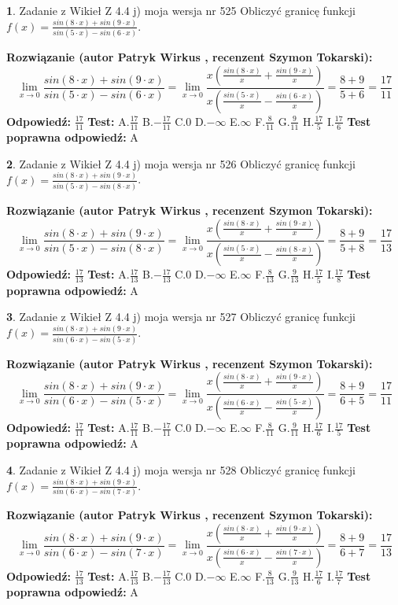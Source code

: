 \documentclass[12pt, a4paper]{article}
\theoremstyle{definition} %
\newtheorem{zad}{}
\newcommand{\zadStart}[1]{\begin{zad}#1\newline}
\newcommand{\zadStop}{\end{zad}}
\newcommand{\rozwStart}[2]{\noindent \textbf{Rozwiązanie (autor #1 , recenzent #2): }\newline}
\newcommand{\rozwStop}{\newline}
\newcommand{\odpStart}{\noindent \textbf{Odpowiedź:}\newline}
\newcommand{\odpStop}{\newline}
\newcommand{\testStart}{\noindent \textbf{Test:}\newline}
\newcommand{\testStop}{\newline}
\newcommand{\kluczStart}{\noindent \textbf{Test poprawna odpowiedź:}\newline}
\newcommand{\kluczStop}{\newline}
\begin{document}
\zadStart{Zadanie z Wikieł Z 4.4 j) moja wersja nr 525}
Obliczyć granicę funkcji $f(x)=\frac{sin(8\cdot x) +sin(9\cdot x)}{sin(5\cdot x) -sin(6\cdot x)}$.
\zadStop
\rozwStart{Patryk Wirkus}{Szymon Tokarski}
$$\lim\limits_{x\to 0}\frac{sin(8\cdot x) +sin(9\cdot x)}{sin(5\cdot x) -sin(6\cdot x)}=\lim\limits_{x\to 0}\frac{x(\frac{sin(8\cdot x)}{x}+\frac{sin(9\cdot x)}{x})}{x(\frac{sin(5\cdot x)}{x}-\frac{sin(6\cdot x)}{x})}=\frac{8+9}{5+6} = \frac{17}{11}$$
\rozwStop
\odpStart
$\frac{17}{11}$
\odpStop
\testStart
A.$\frac{17}{11}$
B.$-\frac{17}{11}$
C.$0$
D.$-\infty$
E.$\infty$
F.$\frac{8}{11}$
G.$\frac{9}{11}$
H.$\frac{17}{5}$
I.$\frac{17}{6}$
\testStop
\kluczStart
A
\kluczStop



\zadStart{Zadanie z Wikieł Z 4.4 j) moja wersja nr 526}
Obliczyć granicę funkcji $f(x)=\frac{sin(8\cdot x) +sin(9\cdot x)}{sin(5\cdot x) -sin(8\cdot x)}$.
\zadStop
\rozwStart{Patryk Wirkus}{Szymon Tokarski}
$$\lim\limits_{x\to 0}\frac{sin(8\cdot x) +sin(9\cdot x)}{sin(5\cdot x) -sin(8\cdot x)}=\lim\limits_{x\to 0}\frac{x(\frac{sin(8\cdot x)}{x}+\frac{sin(9\cdot x)}{x})}{x(\frac{sin(5\cdot x)}{x}-\frac{sin(8\cdot x)}{x})}=\frac{8+9}{5+8} = \frac{17}{13}$$
\rozwStop
\odpStart
$\frac{17}{13}$
\odpStop
\testStart
A.$\frac{17}{13}$
B.$-\frac{17}{13}$
C.$0$
D.$-\infty$
E.$\infty$
F.$\frac{8}{13}$
G.$\frac{9}{13}$
H.$\frac{17}{5}$
I.$\frac{17}{8}$
\testStop
\kluczStart
A
\kluczStop



\zadStart{Zadanie z Wikieł Z 4.4 j) moja wersja nr 527}
Obliczyć granicę funkcji $f(x)=\frac{sin(8\cdot x) +sin(9\cdot x)}{sin(6\cdot x) -sin(5\cdot x)}$.
\zadStop
\rozwStart{Patryk Wirkus}{Szymon Tokarski}
$$\lim\limits_{x\to 0}\frac{sin(8\cdot x) +sin(9\cdot x)}{sin(6\cdot x) -sin(5\cdot x)}=\lim\limits_{x\to 0}\frac{x(\frac{sin(8\cdot x)}{x}+\frac{sin(9\cdot x)}{x})}{x(\frac{sin(6\cdot x)}{x}-\frac{sin(5\cdot x)}{x})}=\frac{8+9}{6+5} = \frac{17}{11}$$
\rozwStop
\odpStart
$\frac{17}{11}$
\odpStop
\testStart
A.$\frac{17}{11}$
B.$-\frac{17}{11}$
C.$0$
D.$-\infty$
E.$\infty$
F.$\frac{8}{11}$
G.$\frac{9}{11}$
H.$\frac{17}{6}$
I.$\frac{17}{5}$
\testStop
\kluczStart
A
\kluczStop



\zadStart{Zadanie z Wikieł Z 4.4 j) moja wersja nr 528}
Obliczyć granicę funkcji $f(x)=\frac{sin(8\cdot x) +sin(9\cdot x)}{sin(6\cdot x) -sin(7\cdot x)}$.
\zadStop
\rozwStart{Patryk Wirkus}{Szymon Tokarski}
$$\lim\limits_{x\to 0}\frac{sin(8\cdot x) +sin(9\cdot x)}{sin(6\cdot x) -sin(7\cdot x)}=\lim\limits_{x\to 0}\frac{x(\frac{sin(8\cdot x)}{x}+\frac{sin(9\cdot x)}{x})}{x(\frac{sin(6\cdot x)}{x}-\frac{sin(7\cdot x)}{x})}=\frac{8+9}{6+7} = \frac{17}{13}$$
\rozwStop
\odpStart
$\frac{17}{13}$
\odpStop
\testStart
A.$\frac{17}{13}$
B.$-\frac{17}{13}$
C.$0$
D.$-\infty$
E.$\infty$
F.$\frac{8}{13}$
G.$\frac{9}{13}$
H.$\frac{17}{6}$
I.$\frac{17}{7}$
\testStop
\kluczStart
A
\kluczStop
\end{document}
